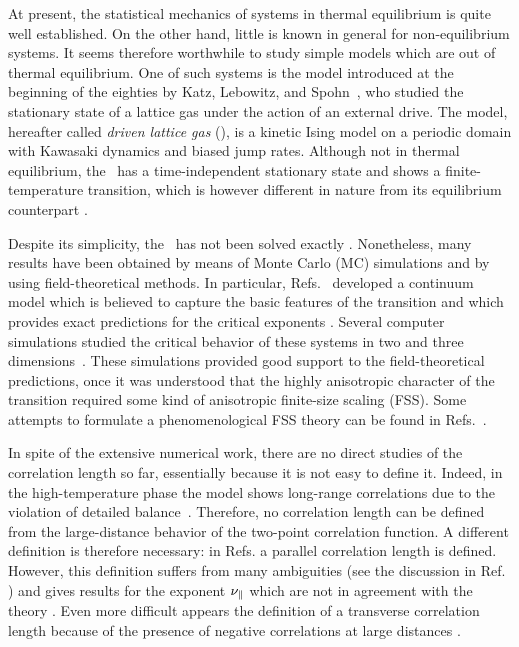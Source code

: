 \documentclass[12pt]{article}
\begin{document}
At present, the statistical mechanics of systems in thermal equilibrium is 
quite well established. On the other hand, little is known in general
for non-equilibrium systems. It seems therefore worthwhile to study simple models
which are out of thermal equilibrium. One of such systems is the model introduced
at the beginning of the eighties by 
Katz, Lebowitz, and Spohn~\cite{Katz}, who studied the 
stationary state of a lattice gas under the action of an external
drive. The model, hereafter called {\it driven lattice gas} (\dlg), is
a kinetic Ising model on a periodic domain with Kawasaki dynamics and
biased jump rates. Although not in thermal equilibrium, the \dlg\
has a time-independent stationary state and shows a finite-temperature 
transition, which is however different in nature from its
equilibrium counterpart \cite{foot1}.

Despite its simplicity, the \dlg\  has not been solved exactly \cite{foot1a}. 
Nonetheless, many results have been obtained by means of Monte Carlo
(MC) simulations and by using field-theoretical methods. 
In particular, Refs.~\cite{Janssen86a,Leung86} 
developed a continuum model which is believed to 
capture the basic features of the transition and which provides 
exact predictions for the critical exponents \cite{foot2}.
Several computer 
simulations studied the critical behavior of these systems in two 
and three dimensions~\cite{Zhang88,Leung92,Wang96,Leung99}. These simulations
provided good support to the field-theoretical predictions, once it was
understood that the highly anisotropic character of the transition
required some kind of anisotropic finite-size scaling (FSS). Some
attempts to formulate a phenomenological FSS theory can be found
in Refs.~\cite{Leung92,Binder89}.

In spite of the extensive numerical work, there are no direct studies of the correlation 
length so far, essentially because it is not easy to define it.
Indeed, in the high-temperature phase the model
shows long-range correlations due to the violation of detailed
balance~\cite{Garrido90,Grinstein91}. Therefore, no correlation length can be defined from
the large-distance behavior of the two-point correlation function. A 
different definition is therefore necessary: in Refs. \cite{Valles8687}
a parallel correlation length is defined. However, this definition suffers
from many ambiguities (see the discussion in Ref. \cite{Schmittmann95}) 
and gives results for the exponent $\nu_{\|}$ which are not in agreement 
with the theory \cite{Zhang88}. Even more difficult appears the definition
of a transverse correlation length because of the presence of negative 
correlations at large distances \cite{Zhang88,Schmittmann95}.
\end{document}
